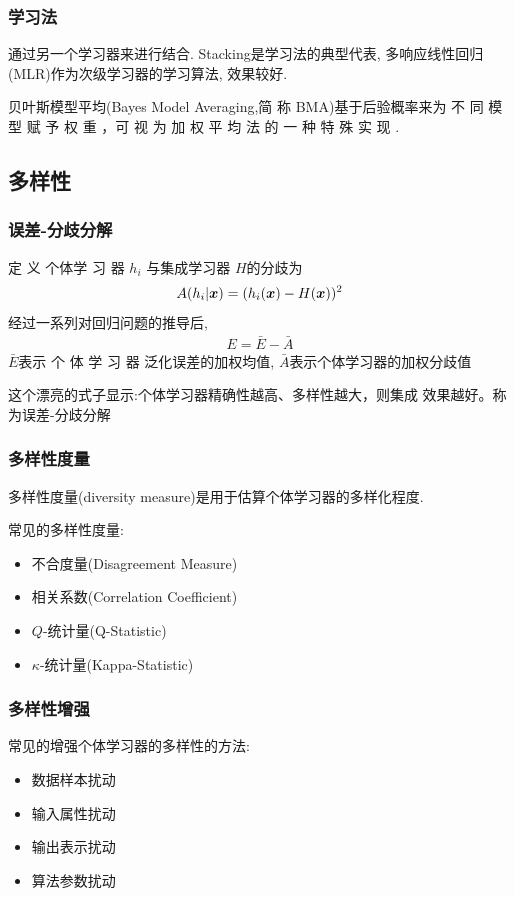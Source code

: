 \subsubsection{学习法}
通过另一个学习器来进行结合. Stacking是学习法的典型代表, 多响应线性回归(MLR)作为次级学习器的学习算法, 效果较好. 


贝叶斯模型平均(Bayes Model Averaging,简 称 BMA)基于后验概率来为
不 同 模 型 赋 予 权 重 ，可 视 为 加 权 平 均 法 的 一 种 特 殊 实 现 . 


\subsection{多样性}
\subsubsection{误差-分歧分解}
定 义 个体学 习 器 $h_i$ 与集成学习器 $H$的分歧为 
\begin{align*}
    A(h_i|\bm{x})=(h_i(\bm{x})-H(\bm{x}))^2
\end{align*}
经过一系列对回归问题的推导后, 
\begin{align*}
    E=\bar{E}-\bar{A}
\end{align*}
$\bar{E}$表示 个 体 学 习 器 泛化误差的加权均值, $\bar{A}$表示个体学习器的加权分歧值

这个漂亮的式子显示:个体学习器精确性越高、多样性越大，则集成
效果越好。称为误差-分歧分解


\subsubsection{多样性度量}
多样性度量(diversity measure)是用于估算个体学习器的多样化程度. 

常见的多样性度量:
\begin{itemize}
    \item 不合度量(Disagreement Measure)
    \item 相关系数(Correlation Coefficient)
    \item $Q$-统计量(Q-Statistic)
    \item $\kappa$-统计量(Kappa-Statistic)
\end{itemize}
\subsubsection{多样性增强}
常见的增强个体学习器的多样性的方法:
\begin{itemize}
    \item 数据样本扰动
    \item 输入属性扰动
    \item 输出表示扰动
    \item 算法参数扰动
\end{itemize}